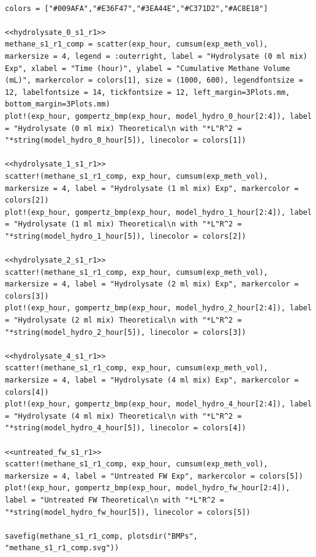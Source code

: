 \documentclass[11pt]{article}
\begin{document}
\begin{verbatim}

colors = ["#009AFA","#E36F47","#3EA44E","#C371D2","#AC8E18"]

<<hydrolysate_0_s1_r1>>
methane_s1_r1_comp = scatter(exp_hour, cumsum(exp_meth_vol), markersize = 4, legend = :outerright, label = "Hydrolysate (0 ml mix) Exp", xlabel = "Time (hour)", ylabel = "Cumulative Methane Volume (mL)", markercolor = colors[1], size = (1000, 600), legendfontsize = 12, labelfontsize = 14, tickfontsize = 12, left_margin=3Plots.mm,  bottom_margin=3Plots.mm)
plot!(exp_hour, gompertz_bmp(exp_hour, model_hydro_0_hour[2:4]), label = "Hydrolysate (0 ml mix) Theoretical\n with "*L"R^2 = "*string(model_hydro_0_hour[5]), linecolor = colors[1])

<<hydrolysate_1_s1_r1>>
scatter!(methane_s1_r1_comp, exp_hour, cumsum(exp_meth_vol), markersize = 4, label = "Hydrolysate (1 ml mix) Exp", markercolor = colors[2])
plot!(exp_hour, gompertz_bmp(exp_hour, model_hydro_1_hour[2:4]), label = "Hydrolysate (1 ml mix) Theoretical\n with "*L"R^2 = "*string(model_hydro_1_hour[5]), linecolor = colors[2])

<<hydrolysate_2_s1_r1>>
scatter!(methane_s1_r1_comp, exp_hour, cumsum(exp_meth_vol), markersize = 4, label = "Hydrolysate (2 ml mix) Exp", markercolor = colors[3])
plot!(exp_hour, gompertz_bmp(exp_hour, model_hydro_2_hour[2:4]), label = "Hydrolysate (2 ml mix) Theoretical\n with "*L"R^2 = "*string(model_hydro_2_hour[5]), linecolor = colors[3])

<<hydrolysate_4_s1_r1>>
scatter!(methane_s1_r1_comp, exp_hour, cumsum(exp_meth_vol), markersize = 4, label = "Hydrolysate (4 ml mix) Exp", markercolor = colors[4])
plot!(exp_hour, gompertz_bmp(exp_hour, model_hydro_4_hour[2:4]), label = "Hydrolysate (4 ml mix) Theoretical\n with "*L"R^2 = "*string(model_hydro_4_hour[5]), linecolor = colors[4])

<<untreated_fw_s1_r1>>
scatter!(methane_s1_r1_comp, exp_hour, cumsum(exp_meth_vol), markersize = 4, label = "Untreated FW Exp", markercolor = colors[5])
plot!(exp_hour, gompertz_bmp(exp_hour, model_hydro_fw_hour[2:4]), label = "Untreated FW Theoretical\n with "*L"R^2 = "*string(model_hydro_fw_hour[5]), linecolor = colors[5])

savefig(methane_s1_r1_comp, plotsdir("BMPs", "methane_s1_r1_comp.svg"))
\end{verbatim}

\begin{center}

\end{center}
\end{document}
